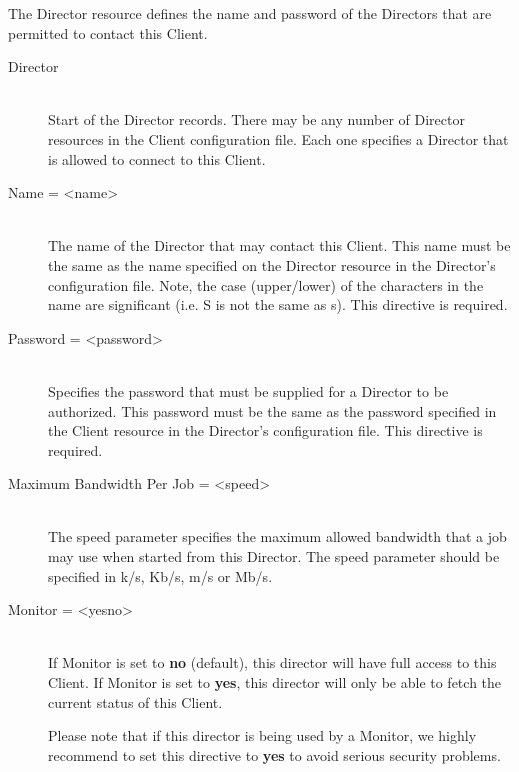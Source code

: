 The Director resource defines the name and password of the Directors that are
permitted to contact this Client.

\begin{description}

\item [Director] \hfill \\
Start of the Director records. There may be any  number of Director resources
in the Client configuration file. Each  one specifies a Director that is
allowed to connect to this  Client.

\item [Name = {\textless}name{\textgreater}] \hfill \\
The name of the Director  that may contact this Client. This name must be the
same as the name specified on the Director resource  in the Director's
configuration file. Note, the case (upper/lower) of the characters in
the name are significant (i.e. S is not the same as s). This directive
is required.

\item [Password = {\textless}password{\textgreater}] \hfill \\
Specifies the password that must be  supplied for a Director to be authorized.
This password  must be the same as the password specified in the  Client
resource in the Director's configuration file.  This directive is required.

\item [Maximum Bandwidth Per Job = {\textless}speed{\textgreater}] \hfill \\
The speed parameter specifies the maximum allowed bandwidth that a job may use
when started from this Director. The speed parameter should be specified in
k/s, Kb/s, m/s or Mb/s.

\item [Monitor = {\textless}yes{\textbar}no{\textgreater}] \hfill \\
If Monitor is set to {\bf no} (default),  this director will have full access
to this Client. If Monitor is set to  {\bf yes}, this director will only be
able to fetch the current status  of this Client.

Please note that if this director is being used by a Monitor, we highly
recommend to set this directive to {\bf yes} to avoid serious security
problems.
\end{description}

